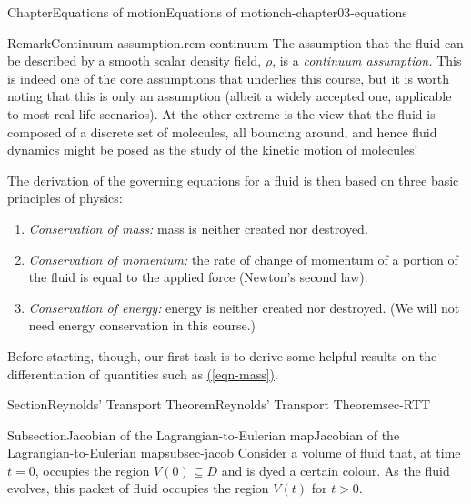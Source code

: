 \documentclass[oneside,10pt,]{book}
\newcommand{\xreffont}{\relax}
\numberwithin{equation}{section}
\begin{document}
\begin{chapterptx}{Chapter}{Equations of motion}{}{Equations of motion}{}{}{ch-chapter03-equations}
\begin{introduction}{}
\begin{remark}{Remark}{Continuum assumption.}{rem-continuum}%
The assumption that the fluid can be described by a smooth scalar density field, \(\rho\), is a \emph{continuum assumption.} This is indeed one of the core assumptions that underlies this course, but it is worth noting that this is only an assumption (albeit a widely accepted one, applicable to most real-life scenarios). At the other extreme is the view that the fluid is composed of a discrete set of molecules, all bouncing around, and hence fluid dynamics might be posed as the study of the kinetic motion of molecules!%
\end{remark}
The derivation of the governing equations for a fluid is then based on three basic principles of physics:%
\begin{enumerate}
\item{}\emph{Conservation of mass:} mass is neither created nor destroyed.%
\item{}\emph{Conservation of momentum:} the rate of change of momentum of a portion of the fluid is equal to the applied force (Newton's second law).%
\item{}\emph{Conservation of energy:} energy is neither created nor destroyed. (We will not need energy conservation in this course.)%
\end{enumerate}
%
\par
Before starting, though, our first task is to derive some helpful results on the differentiation of quantities such as \hyperref[eqn-mass]{({\xreffont\ref{eqn-mass}})}.%
\end{introduction}%
%
%
\typeout{************************************************}
\typeout{************************************************}
%
\begin{sectionptx}{Section}{Reynolds' Transport Theorem}{}{Reynolds' Transport Theorem}{}{}{sec-RTT}
%
%
\typeout{************************************************}
\typeout{************************************************}
%
\begin{subsectionptx}{Subsection}{Jacobian of the Lagrangian-to-Eulerian map}{}{Jacobian of the Lagrangian-to-Eulerian map}{}{}{subsec-jacob}
Consider a volume of fluid that, at time \(t = 0\), occupies the region \(V(0)
\subseteq D\) and is dyed a certain colour. As the fluid evolves, this packet of fluid occupies the region \(V(t)\) for \(t > 0\).%
\par

\end{subsectionptx}
\end{sectionptx}
\end{chapterptx}
\end{document}
